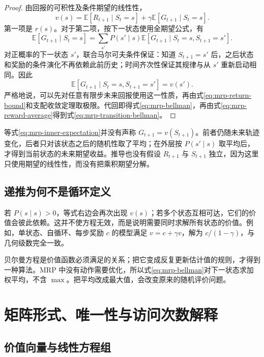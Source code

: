 \documentclass[UTF8]{ctexart}
\begin{document}
\begin{proof}
由回报的可积性及条件期望的线性性，
\[
  v(s)=\mathbb E[R_{t+1}\mid S_t=s]
      +\gamma\mathbb E[G_{t+1}\mid S_t=s].
\]
第一项是 $r(s)$。对于第二项，按下一状态使用全期望公式，有
\[
  \mathbb E[G_{t+1}\mid S_t=s]
  =\sum_{s'}P(s'\mid s)
     \mathbb E[G_{t+1}\mid S_t=s,S_{t+1}=s'].
\]
对正概率的下一状态 $s'$，联合马尔可夫条件保证：知道 $S_{t+1}=s'$ 后，之后状态和奖励的条件演化不再依赖此前历史；时间齐次性保证其规律与从 $s'$ 重新启动相同。因此
\begin{equation}
  \mathbb E[G_{t+1}\mid S_t=s,S_{t+1}=s']=v(s').
  \label{eq:mrp-inner-expectation}
\end{equation}
严格地说，可以先对任意有限步未来回报使用这一性质，再由式\eqref{eq:mrp-return-bound}和支配收敛定理取极限。代回即得式\eqref{eq:mrp-bellman}，再由式\eqref{eq:mrp-reward-average}得到式\eqref{eq:mrp-transition-bellman}。
\end{proof}

等式\eqref{eq:mrp-inner-expectation}并没有声称 $G_{t+1}=v(S_{t+1})$。前者仍随未来轨迹变化，后者只对该状态之后的随机性取了平均；在外层按 $P(s'\mid s)$ 取平均后，才得到当前状态的未来期望收益。推导也没有假设 $R_{t+1}$ 与 $S_{t+1}$ 独立，因为这里只使用期望的线性性，而没有把乘积期望分解。

\subsection{递推为何不是循环定义}

若 $P(s\mid s)>0$，等式右边会再次出现 $v(s)$；若多个状态互相可达，它们的价值会彼此依赖。这并不使方程无效，而是说明需要同时求解所有状态的价值。例如，单状态、自循环、每步奖励 $c$ 的模型满足 $v=c+\gamma v$，解为 $c/(1-\gamma)$，与几何级数完全一致。

贝尔曼方程是价值函数必须满足的关系；把它变成反复更新估计值的规则，才得到一种算法。MRP 中没有动作需要优化，所以式\eqref{eq:mrp-bellman}对下一状态求加权平均，不含 $\max$。把平均改成最大值，会改变原来的随机评价问题。

\section{矩阵形式、唯一性与访问次数解释}
\label{sec:mrp-matrix}

\subsection{价值向量与线性方程组}
\end{document}
